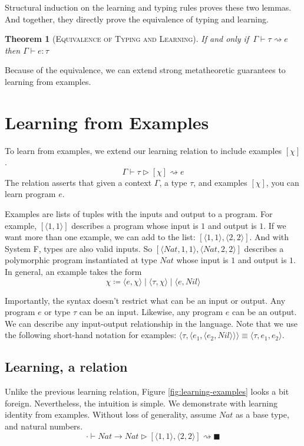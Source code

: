 \documentclass[sigplan,10pt]{acmart}
\theoremstyle{mytheoremstyle}
\newtheorem{theorem}{Theorem}[section]
\begin{document}
Structural induction on the learning and typing rules proves these two lemmas. And together, they directly prove the equivalence of typing and learning.

\begin{theorem}[\textsc{Equivalence of Typing and Learning}]
If and only if $\,\Gamma \vdash \tau \rightsquigarrow e$ then $\Gamma \vdash e : \tau$
\label{equivalence-learning}
\end{theorem}

Because of the equivalence, we can extend strong metatheoretic guarantees to learning from examples. 

\section{Learning from Examples}
To learn from examples, we extend our learning relation to include examples $[\chi]$.
$$\Gamma \vdash \tau \rhd [\chi] \rightsquigarrow e$$
The relation asserts that given a context $\Gamma$, a type $\tau$, and examples $[\chi]$, you can learn program $e$.

Examples are lists of tuples with the inputs and output to a program. For example, $[\langle 1,1\rangle]$ describes a program whose input is $1$ and output is $1$. If we want more than one example, we can add to the list: $[\langle 1, 1\rangle, \langle 2,2 \rangle]$. And with System F, types are also valid inputs. So $[\langle Nat,1,1\rangle, \langle Nat,2,2\rangle]$ describes a polymorphic program instantiated at type $Nat$ whose input is $1$ and output is $1$. In general, an example takes the form
$$ \chi \coloneqq \langle e, \chi\rangle \mid \langle \tau, \chi\rangle \mid \langle e,Nil\rangle$$

Importantly, the syntax doesn't restrict what can be an input or output. Any program $e$ or type $\tau$ can be an input. Likewise, any program $e$ can be an output. We can describe any input-output relationship in the language. Note that we use the following short-hand notation for examples: $\langle\tau,\langle e_1, \langle e_2, Nil\rangle\rangle\rangle \equiv \langle \tau, e_1, e_2\rangle$.

\subsection{Learning, a relation}

Unlike the previous learning relation, Figure \ref{fig:learning-examples} looks a bit foreign. Nevertheless, the intuition is simple. We demonstrate with learning identity from examples. Without loss of generality, assume $Nat$ as a base type, and natural numbers.
$$\cdot \vdash Nat \!\to\! Nat \rhd [\langle 1,1\rangle,\langle 2,2 \rangle] \rightsquigarrow \blacksquare$$
\end{document}
